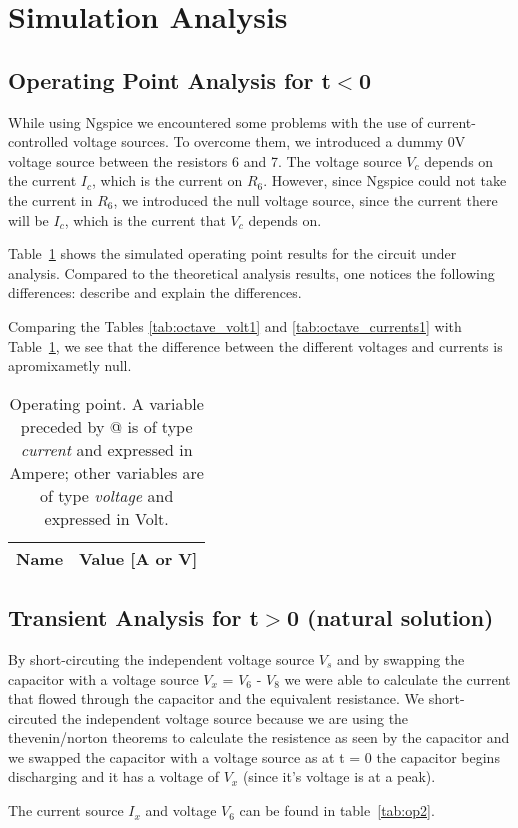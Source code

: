 \section{Simulation Analysis}
\label{sec:simulation}

\subsection{Operating Point Analysis for t$<$0}
\label{subsec:op_analysis}

\tab While using Ngspice we encountered some problems with the use of current-controlled voltage sources. To overcome them, we introduced a dummy 0V voltage source between the resistors 6 and 7.
The voltage source $V_c$ depends on the current $I_c$, which is the current on $R_6$. However, since Ngspice could not take the current in $R_6$, we introduced the null voltage source, since the current there will be $I_c$, which is the current that $V_c$ depends on.

Table~\ref{tab:op} shows the simulated operating point results for the circuit
under analysis. Compared to the theoretical analysis results, one notices the
following differences: describe and explain the differences.

Comparing the Tables \ref{tab:octave_volt1} and \ref{tab:octave_currents1} with Table~\ref{tab:op}, we see that the difference between the different voltages and currents is apromixametly null.\par
\begin{table}[H]
  \centering
  \begin{tabular}{|l|r|}
    \hline    
    {\bf Name} & {\bf Value [A or V]} \\ \hline
    
  \end{tabular}
  \caption{Operating point. A variable preceded by @ is of type {\em current}
    and expressed in Ampere; other variables are of type {\it voltage} and expressed in
    Volt.}
  \label{tab:op}
\end{table}

\subsection{Transient Analysis for t$>$0 (natural solution)}
\tab By short-circuting the independent voltage source $V_s$ and by swapping the capacitor with a voltage source $V_x$ = $V_6$ - $V_8$ we were able to calculate the current that flowed through the capacitor and the equivalent resistance. We short-circuted the independent voltage source because we are using the thevenin/norton theorems to calculate the resistence as seen by the capacitor and we swapped the capacitor with a voltage source as at t = 0 the capacitor begins discharging and it has a voltage of $V_x$ (since it's voltage is at a peak).\par
The current source $I_x$ and voltage $V_6$ can be found in table~\ref{tab:op2}.

